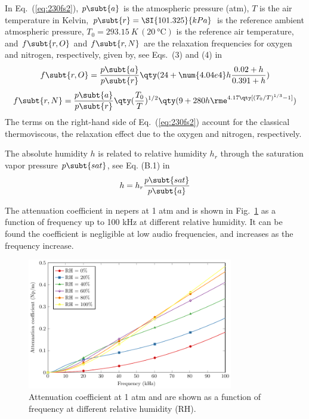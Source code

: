 In Eq.~(\ref{eq:230fs2}), $p\subt{a}$ is the atmospheric pressure (atm), $T$ is the air temperature in Kelvin,  $p\subt{r} = \SI{101.325}{kPa}$ is the reference ambient atmospheric pressure, $T_0 = \SI{293.15}{K}\, (\SI{20}{\celsius})$ is the reference air temperature, and $f\subt{r,O}$ and $f\subt{r,N}$ are the relaxation frequencies for oxygen and nitrogen, respectively, given by, see Eqs.~(3) and (4) in \cite{1993ISO961311993}
\begin{equation}
    f\subt{r,O} = 
    \frac{p\subt{a}}{p\subt{r}}
    \qty(24+\num{4.04e4} h \frac{0.02+h}{0.391+h})
    \label{eq:3223fd}
\end{equation}
\begin{equation}
    f\subt{r,N} = 
    \frac{p\subt{a}}{p\subt{r}}
    \qty(\frac{T_0}{T})^{1/2}\qty(9+ 280 h \rme^{4.17 \qty[(T_0/T)^{1/3}-1]})
    \label{eq:1101010}
\end{equation}
The terms on the right-hand side of Eq.~(\ref{eq:230fs2}) account for the classical thermoviscous, the relaxation effect due to the oxygen and nitrogen, respectively.

The absolute humidity $h$ is related to relative humidity $h_r$ through the saturation vapor pressure $p\subt{sat}$, see Eq. (B.1) in \cite{1993ISO961311993}
\begin{equation}
    h=h_r\frac{p\subt{sat}}{p\subt{a}}
    \label{eq:1203100}
\end{equation}

The attenuation coefficient in nepers at 1 atm and  is shown in Fig.~\ref{fig:412031200} as a function of frequency up to 100 kHz at different relative humidity.
It can be found the coefficient is negligible at low audio frequencies, and increases as the frequency increase. 

\begin{figure}[!htb]
    \centering
    \includegraphics[width = 0.8\textwidth]{fig/AbsorpCoeff_Compare_211014A_v2.pdf}
    \caption{Attenuation coefficient at 1 atm and   are shown as a function of frequency at different relative humidity (RH).}
    \label{fig:412031200}
\end{figure}


